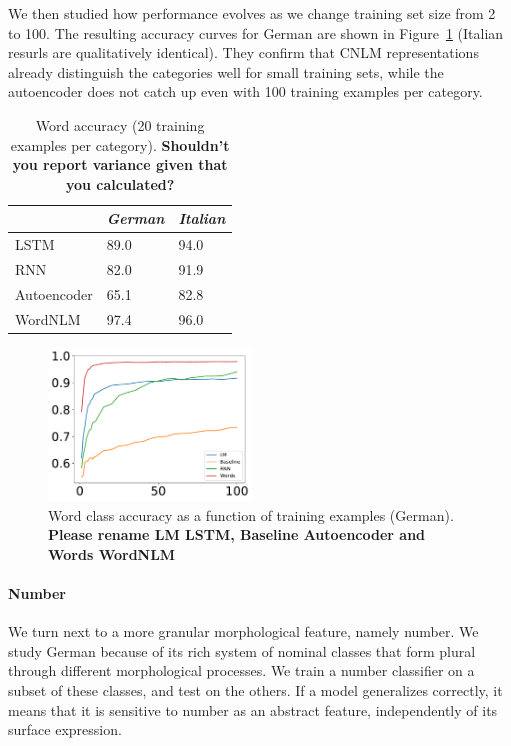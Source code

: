 We then studied how performance evolves as we change training set size from 2 to 100. The resulting accuracy curves for German are shown in Figure~\ref{fig:pos-induction} (Italian resurls are qualitatively identical). They confirm that CNLM representations already distinguish the categories well for small training sets, while the autoencoder does not catch up even with 100 training examples per category.

\begin{table}[t]
  \begin{center}
    \begin{tabular}{l|l|l}
   &\emph{German}&\emph{Italian}\\
      \hline
      LSTM & 89.0 & 94.0 \\
      RNN & 82.0 & 91.9 \\
      Autoencoder & 65.1 & 82.8 \\
      WordNLM & 97.4 & 96.0 \\
    \end{tabular}
  \end{center}
  \caption{\label{tab:pos-results} Word  accuracy (20 training examples per category). \textbf{Shouldn't you report variance given that you calculated?}}
\end{table}


\begin{figure}
\includegraphics[width=0.48\textwidth]{figures/german_pos_nouns_verbs.pdf}
	\caption{Word class accuracy as a function of training examples (German). \textbf{Please rename LM LSTM, Baseline Autoencoder and Words WordNLM}}\label{fig:pos-induction}
\end{figure}





\paragraph{Number}
We turn next to a more granular morphological feature, namely
number. We study German because of its rich system of nominal classes
that form plural through different morphological processes. We train a
number classifier on a subset of these classes, and test on the
others. If a model generalizes correctly, it means that it is
sensitive to number as an abstract feature, independently of its
surface expression.


